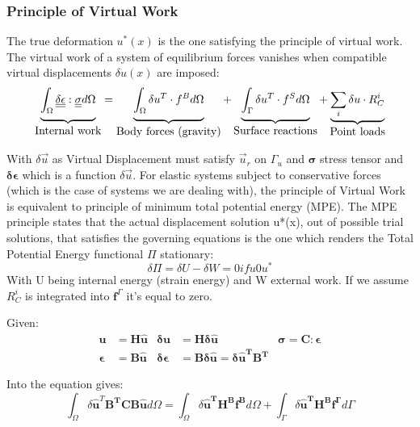 \subsubsection{Principle of Virtual Work}
The true deformation $u^*(x)$ is the one satisfying the principle of virtual work. The virtual work of a system of equilibrium forces vanishes when compatible virtual displacements $\delta u(x)$ are imposed:
\begin{equation}
\underbrace{	\int_{\Omega}\underline{\underline{\delta\epsilon}}:\underline{\underline{\sigma}} d\Omega
\rule[-12pt]{0pt}{5pt}}_{\mbox{Internal work}}
=
\underbrace{	\int_{\Omega}\delta u^{T} \cdot f^{B}d\Omega \rule[-12pt]{0pt}{5pt}}_{\mbox{Body forces (gravity)}}
+ 
\underbrace{	\int_{\Gamma}\delta u^{T} \cdot f^{S}d\Omega \rule[-12pt]{0pt}{5pt}}_{\mbox{Surface reactions}}
+ 
\underbrace{	\sum_{i}\delta u \cdot R_{C}^{i}			\rule[-12pt]{0pt}{5pt}}_{\mbox{Point loads}}
\end{equation}

With $\delta \vec{u}$ as Virtual Displacement must satisfy $ \vec{u}_r$ on $\Gamma_u$ and $\boldsymbol{\sigma}$ stress tensor and $\boldsymbol{\delta \epsilon}$ which is a function $\delta \vec{u}$.  
For elastic systems subject to conservative forces (which is the case of systems we are dealing with), the principle of Virtual Work is equivalent to principle of minimum total potential energy (MPE).
The MPE principle states that the actual displacement solution u*(x), out of possible trial solutions, that satisfies the governing equations is the one which renders the Total Potential Energy functional $\Pi$ stationary:
\begin{equation}
\delta \Pi = \delta U - \delta W=0 if u0u^*
\end{equation}
With U being internal energy (strain energy) and W external work.
If we assume $R^i_C$ is integrated into $\boldsymbol{f}^{\Gamma}$ it's equal to zero.

Given:
\begin{align*}
\boldsymbol{u}		&=\boldsymbol{H\hat{u}} & \boldsymbol{\delta u }	&=\boldsymbol{H\delta\hat{u}} & \boldsymbol{\sigma=C:\epsilon} \\
\boldsymbol{\epsilon}&=\boldsymbol{B\hat{u}} & \boldsymbol{\delta \epsilon}	&=\boldsymbol{B\delta\hat{u}=\delta\hat{u}^T B^T}
\end{align*}

Into the equation gives:
\begin{equation}
\int_{\Omega}\delta \boldsymbol{\hat{u}}^T\boldsymbol{B^TCB}\boldsymbol{\hat{u}} d \Omega
=
\int_{\Omega}\delta \boldsymbol{\hat{u}^{T}  H^{B} f^B } d\Omega 
+ 
\int_{\Gamma}\delta \boldsymbol{\hat{u}^{T}  H^{B} f^{\Gamma} } d\Gamma
\end{equation}

